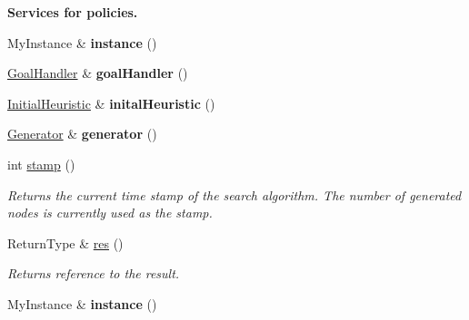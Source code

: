 \begin{Indent}{\bf Services for policies.}\par
\begin{DoxyCompactItemize}
\item 
My\+Instance \& {\bfseries instance} ()\hypertarget{structalgorithm_1_1Algorithm_adb72eaefc777f83c004d2f1e3bc228d1}{}\label{structalgorithm_1_1Algorithm_adb72eaefc777f83c004d2f1e3bc228d1}

\item 
\hyperlink{structalgorithm_1_1Algorithm_af9111b0a505a193a2c4878b710b8ea65}{Goal\+Handler} \& {\bfseries goal\+Handler} ()\hypertarget{structalgorithm_1_1Algorithm_a08254355b494b271e46bee2ceb6d3947}{}\label{structalgorithm_1_1Algorithm_a08254355b494b271e46bee2ceb6d3947}

\item 
\hyperlink{structalgorithm_1_1Algorithm_aa0c111908e844c0ff5cfe78f778bba52}{Initial\+Heuristic} \& {\bfseries inital\+Heuristic} ()\hypertarget{structalgorithm_1_1Algorithm_a7a1d2a064257f7ea9fb45eb8130f66cd}{}\label{structalgorithm_1_1Algorithm_a7a1d2a064257f7ea9fb45eb8130f66cd}

\item 
\hyperlink{structalgorithm_1_1Algorithm_a4b5d0c94b49b586bd31af92ed6ec94ad}{Generator} \& {\bfseries generator} ()\hypertarget{structalgorithm_1_1Algorithm_a5d672b3ffbb4d7ed627d21b8840255cb}{}\label{structalgorithm_1_1Algorithm_a5d672b3ffbb4d7ed627d21b8840255cb}

\item 
int \hyperlink{structalgorithm_1_1Algorithm_a8397b85b3f810d007bfb82a4aafa2dcf}{stamp} ()
\begin{DoxyCompactList}\small\item\em Returns the current time stamp of the search algorithm. The number of generated nodes is currently used as the stamp. \end{DoxyCompactList}\item 
Return\+Type \& \hyperlink{structalgorithm_1_1Algorithm_a247e95d77c29e1984ece6cd33368071c}{res} ()
\begin{DoxyCompactList}\small\item\em Returns reference to the result. \end{DoxyCompactList}\item 
My\+Instance \& {\bfseries instance} ()\hypertarget{structalgorithm_1_1Algorithm_adb72eaefc777f83c004d2f1e3bc228d1}{}\label{structalgorithm_1_1Algorithm_adb72eaefc777f83c004d2f1e3bc228d1}


\end{DoxyCompactItemize}
\end{Indent}
